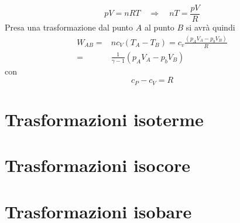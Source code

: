 \documentclass[x11names]{report}
\begin{document}
	\[ 
	pV = nRT \quad \Rightarrow \quad nT = \frac{pV}{R}
	\]
	Presa una trasformazione dal punto \(A\) al punto \(B\) si avrà quindi
	\begin{align*}
		W_{AB} =& nc_{V}(T_{A} - T_{B}) = c_{v}\frac{(p_{A}V_{A} - p_{b}V_{B})}{R} \\
		=& \frac{1}{\gamma -1}(p_{A}V_{A} - p_{b}V_{B})
	\end{align*}
	con 
	\[ 
	\boxed{c_{P} - c_{V} = R}
	\]
	
	
	\section{Trasformazioni isoterme}
	\section{Trasformazioni isocore}
	\section{Trasformazioni isobare}
	
	
\end{document}
